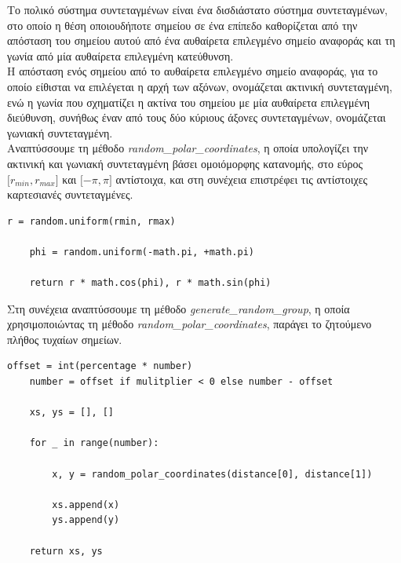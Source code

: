 \documentclass[12pt]{article}
\begin{document}
Tο πολικό σύστημα συντεταγμένων είναι ένα δισδιάστατο σύστημα συντεταγμένων,
στο οποίο η θέση οποιουδήποτε σημείου σε ένα επίπεδο καθορίζεται από την απόσταση του σημείου αυτού
από ένα αυθαίρετα επιλεγμένο σημείο αναφοράς και τη γωνία από μία αυθαίρετα επιλεγμένη κατεύθυνση. \\

Η απόσταση ενός σημείου από το αυθαίρετα επιλεγμένο σημείο αναφοράς,
για το οποίο είθισται να επιλέγεται η αρχή των αξόνων,
ονομάζεται ακτινική συντεταγμένη, ενώ η γωνία που σχηματίζει η ακτίνα του σημείου
με μία αυθαίρετα επιλεγμένη διεύθυνση, συνήθως έναν από τους δύο κύριους άξονες συντεταγμένων,
ονομάζεται γωνιακή συντεταγμένη. \\

Αναπτύσσουμε τη μέθοδο \textit{random\_polar\_coordinates},
η οποία υπολογίζει την ακτινική και γωνιακή συντεταγμένη βάσει ομοιόμορφης κατανομής,
στο εύρος \( \lbrack r_{min}, r_{max} \rbrack \) και \( \lbrack -\pi, \pi \rbrack \)
αντίστοιχα, και στη συνέχεια επιστρέφει τις αντίστοιχες καρτεσιανές συντεταγμένες. \\

\begin{lstlisting}[caption={Η μέθοδος \textit{random\_polar\_coordinates}}]
    r = random.uniform(rmin, rmax)

    phi = random.uniform(-math.pi, +math.pi)

    return r * math.cos(phi), r * math.sin(phi)
\end{lstlisting}

\pagebreak

Στη συνέχεια αναπτύσσουμε τη μέθοδο \textit{generate\_random\_group},
η οποία χρησιμοποιώντας τη μέθοδο \textit{random\_polar\_coordinates},
παράγει το ζητούμενο πλήθος τυχαίων σημείων. \\

\begin{lstlisting}[caption={Η μέθοδος \textit{generate\_random\_group}}]
    offset = int(percentage * number)
    number = offset if mulitplier < 0 else number - offset

    xs, ys = [], []

    for _ in range(number):

        x, y = random_polar_coordinates(distance[0], distance[1])

        xs.append(x)
        ys.append(y)

    return xs, ys
\end{lstlisting}
\end{document}

